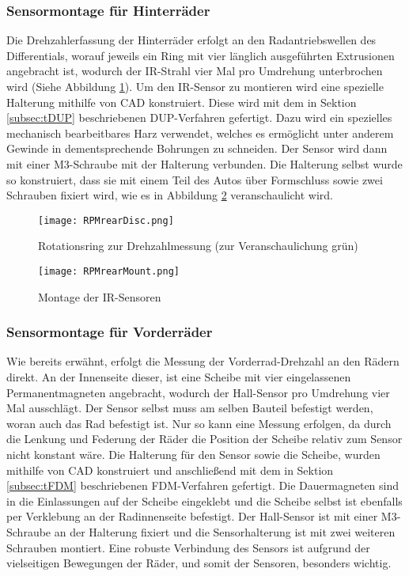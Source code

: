 \subsubsection{Sensormontage für Hinterräder}
\label{subsubsec:RPMmountRear}
Die Drehzahlerfassung der Hinterräder erfolgt an den Radantriebswellen des Differentials, worauf jeweils ein Ring mit vier länglich ausgeführten Extrusionen angebracht ist, wodurch der \ac{IR}-Strahl vier Mal pro Umdrehung unterbrochen wird (Siehe Abbildung \ref{fig:RPMrearDisc}). Um den \ac{IR}-Sensor zu montieren wird eine spezielle Halterung mithilfe von \ac{CAD} konstruiert. Diese wird mit dem in Sektion \ref{subsec:tDUP} beschriebenen \ac{DUP}-Verfahren gefertigt. Dazu wird ein spezielles mechanisch bearbeitbares Harz verwendet, welches es ermöglicht unter anderem Gewinde in dementsprechende Bohrungen zu schneiden. Der Sensor wird dann mit einer M3-Schraube mit der Halterung verbunden. Die Halterung selbst wurde so konstruiert, dass sie mit einem Teil des Autos über Formschluss sowie zwei Schrauben fixiert wird, wie es in Abbildung \ref{fig:RPMrearMount} veranschaulicht wird.
\begin{figure}[h]
\centering
\texttt{[image: RPMrearDisc.png]}
\caption{Rotationsring zur Drehzahlmessung (zur Veranschaulichung grün)}
\label{fig:RPMrearDisc}
\end{figure}

\begin{figure}[h]
\centering
\texttt{[image: RPMrearMount.png]}
\caption{Montage der \ac{IR}-Sensoren}
\label{fig:RPMrearMount}
\end{figure}

\newpage
\subsubsection{Sensormontage für Vorderräder}
\label{subsubsec:RPMmountFront}
Wie bereits erwähnt, erfolgt die Messung der Vorderrad-Drehzahl an den Rädern direkt. An der Innenseite dieser, ist eine Scheibe mit vier eingelassenen Permanentmagneten angebracht, wodurch der Hall-Sensor pro Umdrehung vier Mal ausschlägt. Der Sensor selbst muss am selben Bauteil befestigt werden, woran auch das Rad befestigt ist. Nur so kann eine Messung erfolgen, da durch die Lenkung und Federung der Räder die Position der Scheibe relativ zum Sensor nicht konstant wäre. Die Halterung für den Sensor sowie die Scheibe, wurden mithilfe von \ac{CAD} konstruiert und anschließend mit dem in Sektion \ref{subsec:tFDM} beschriebenen \ac{FDM}-Verfahren gefertigt. Die Dauermagneten sind in die Einlassungen auf der Scheibe eingeklebt und die Scheibe selbst ist ebenfalls per Verklebung an der Radinnenseite befestigt. Der Hall-Sensor ist mit einer M3-Schraube an der Halterung fixiert und die Sensorhalterung ist mit zwei weiteren Schrauben montiert. Eine robuste Verbindung des Sensors ist aufgrund der vielseitigen Bewegungen der Räder, und somit der Sensoren, besonders wichtig.

